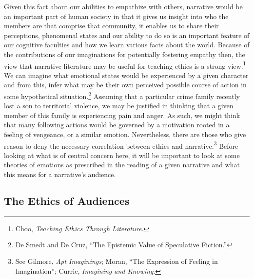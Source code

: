 \documentclass[phdthesis,12pt,final]{wuthesis}
\theoremstyle{definition}
\theoremstyle{definition}
\theoremstyle{definition}
\theoremstyle{definition}
\theoremstyle{remark}
\begin{document}
Given this fact about our abilities to empathize with others, narrative would be an important part of human society in that it gives us insight into who the members are that comprise that community, it enables us to share their perceptions, phenomenal states and our ability to do so is an important feature of our cognitive faculties and how we learn various facts about the world. Because of the contributions of our imaginations for potentially fostering empathy then, the view that narrative literature may be useful for teaching ethics is a strong view.\footnote{Choo, \emph{Teaching Ethics Through Literature}.} We can imagine what emotional states would be experienced by a given character and from this, infer what may be their own perceived possible course of action in some hypothetical situation.\footnote{De Smedt and De Cruz, {``The Epistemic Value of Speculative Fiction.''}} Assuming that a particular crime family recently lost a son to territorial violence, we may be justified in thinking that a given member of this family is experiencing pain and anger. As such, we might think that many following actions would be governed by a motivation rooted in a feeling of vengeance, or a similar emotion. Nevertheless, there are those who give reason to deny the necessary correlation between ethics and narrative.\footnote{See Gilmore, \emph{Apt {Imaginings}}; Moran, {``The {Expression} of {Feeling} in {Imagination}''}; Currie, \emph{Imagining and Knowing}.} Before looking at what is of central concern here, it will be important to look at some theories of emotions as prescribed in the reading of a given narrative and what this means for a narrative's audience.

\subsection*{The Ethics of Audiences}\label{the-ethics-of-audiences}
\end{document}
